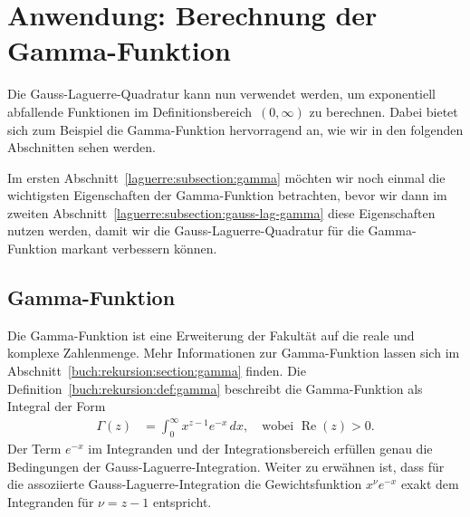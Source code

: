 %
%
%
\section{Anwendung: Berechnung der
  Gamma-Funktion%
  \label{laguerre:section:quad-gamma}}
%
Die Gauss-Laguerre-Quadratur kann nun verwendet werden,
um exponentiell abfallende Funktionen im Definitionsbereich~$(0, \infty)$
zu berechnen.
Dabei bietet sich zum Beispiel die Gamma-Funktion hervorragend an,
wie wir in den folgenden Abschnitten sehen werden.

Im ersten Abschnitt~\ref{laguerre:subsection:gamma} möchten wir noch einmal
die wichtigsten Eigenschaften der Gamma-Funktion betrachten,
bevor wir dann im zweiten Abschnitt~\ref{laguerre:subsection:gauss-lag-gamma}
diese Eigenschaften nutzen werden,
damit wir die Gauss-Laguerre-Quadratur für die Gamma-Funktion
markant verbessern können.

\subsection{Gamma-Funktion%
\label{laguerre:subsection:gamma}}
Die Gamma-Funktion ist eine Erweiterung der Fakultät auf die reale und komplexe
%
%
Zahlenmenge.
Mehr Informationen zur Gamma-Funktion lassen sich im
Abschnitt~\ref{buch:rekursion:section:gamma} finden.
Die Definition~\ref{buch:rekursion:def:gamma} beschreibt die Gamma-Funktion als
Integral der Form
\begin{align}
\Gamma(z)
 & =
\int_0^\infty x^{z-1} e^{-x} \, dx
,
\quad
\text{wobei } \operatorname{Re}(z) > 0
\label{laguerre:gamma}
.
\end{align}
Der Term $e^{-x}$ im Integranden und der Integrationsbereich erfüllen
genau die Bedingungen der Gauss-Laguerre-Integration.
Weiter zu erwähnen ist, dass für die assoziierte Gauss-Laguerre-Integration die
Gewichtsfunktion $x^\nu e^{-x}$  exakt dem Integranden
für $\nu = z - 1$ entspricht.

